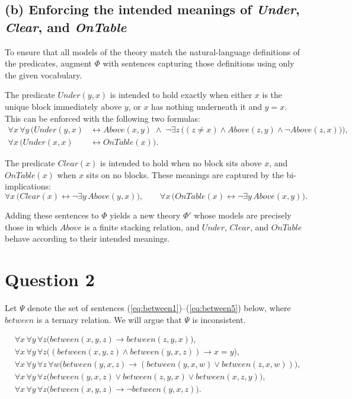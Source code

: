 \documentclass[12pt]{article}
\begin{document}
\subsection*{(b) Enforcing the intended meanings of \textit{Under}, \textit{Clear}, and \textit{OnTable}}

To ensure that all models of the theory match the natural-language definitions of the predicates, augment $\Phi$ with sentences capturing those definitions using only the given vocabulary.

The predicate $\mathit{Under}(y,x)$ is intended to hold exactly when either $x$ is the unique block immediately above $y$, or $x$ has nothing underneath it and $y = x$. This can be enforced with the following two formulas:
\begin{align*}
\forall x\,\forall y\,\bigl(\mathit{Under}(y,x) &\leftrightarrow \mathit{Above}(x,y)\;\wedge\; \neg\exists z\,\bigl((z \neq x) \wedge \mathit{Above}(z,y) \wedge \neg \mathit{Above}(z,x)\bigr)\bigr), \\
\forall x\,\bigl(\mathit{Under}(x,x) &\leftrightarrow \mathit{OnTable}(x)\bigr).
\end{align*}

The predicate $\mathit{Clear}(x)$ is intended to hold when no block sits above $x$, and $\mathit{OnTable}(x)$ when $x$ sits on no blocks. These meanings are captured by the bi-implications:
\[
\forall x\,\bigl(\mathit{Clear}(x) \leftrightarrow \neg\exists y\,\mathit{Above}(y,x)\bigr),
\qquad
\forall x\,\bigl(\mathit{OnTable}(x) \leftrightarrow \neg\exists y\,\mathit{Above}(x,y)\bigr).
\]

Adding these sentences to $\Phi$ yields a new theory $\Phi'$ whose models are precisely those in which $\mathit{Above}$ is a finite stacking relation, and $\mathit{Under}$, $\mathit{Clear}$, and $\mathit{OnTable}$ behave according to their intended meanings.

\section*{Question 2}

Let $\Psi$ denote the set of sentences (\ref{eq:between1})–(\ref{eq:between5}) below, where $\mathit{between}$ is a ternary relation.  We will argue that $\Psi$ is inconsistent.

\begin{align}
&\forall x\,\forall y\,\forall z\bigl(\mathit{between}(x,y,z) \to \mathit{between}(z,y,x)\bigr),\label{eq:between1}\\
&\forall x\,\forall y\,\forall z\bigl((\mathit{between}(x,y,z) \wedge \mathit{between}(y,x,z)) \to x=y\bigr),\label{eq:between2}\\
&\forall x\,\forall y\,\forall z\,\forall w\bigl(\mathit{between}(y,x,z) \to (\mathit{between}(y,x,w) \lor \mathit{between}(z,x,w))\bigr),\label{eq:between3}\\
&\forall x\,\forall y\,\forall z\bigl(\mathit{between}(y,x,z) \lor \mathit{between}(z,y,x) \lor \mathit{between}(x,z,y)\bigr),\label{eq:between4}\\
&\forall x\,\forall y\,\forall z\bigl(\mathit{between}(x,y,z) \to \neg\mathit{between}(y,x,z)\bigr).
\label{eq:between5}
\end{align}
\end{document}
